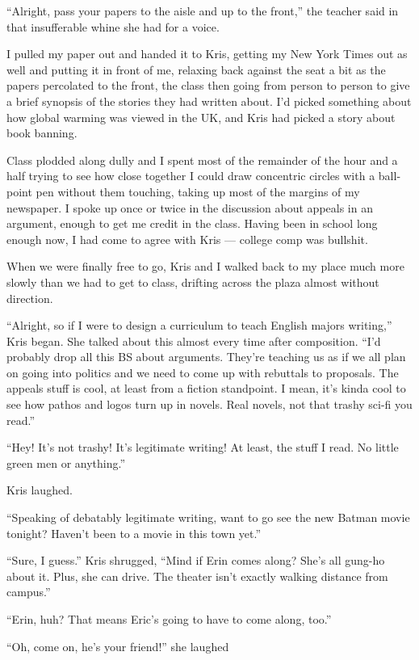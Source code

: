 ``Alright, pass your papers to the aisle and up to the front,'' the teacher said in that insufferable whine she had for a voice.

I pulled my paper out and handed it to Kris, getting my New York Times out as well and putting it in front of me, relaxing back against the seat a bit as the papers percolated to the front, the class then going from person to person to give a brief synopsis of the stories they had written about.  I'd picked something about how global warming was viewed in the UK, and Kris had picked a story about book banning.

Class plodded along dully and I spent most of the remainder of the hour and a half trying to see how close together I could draw concentric circles with a ball-point pen without them touching, taking up most of the margins of my newspaper.  I spoke up once or twice in the discussion about appeals in an argument, enough to get me credit in the class.  Having been in school long enough now, I had come to agree with Kris ---  college comp was bullshit.

When we were finally free to go, Kris and I walked back to my place much more slowly than we had to get to class, drifting across the plaza almost without direction.

``Alright, so if I were to design a curriculum to teach English majors writing,'' Kris began.  She talked about this almost every time after composition.  ``I'd probably drop all this BS about arguments.  They're teaching us as if we all plan on going into politics and we need to come up with rebuttals to proposals.  The appeals stuff is cool, at least from a fiction standpoint.  I mean, it's kinda cool to see how pathos and logos turn up in novels.  Real novels, not that trashy sci-fi you read.''

``Hey!  It's not trashy!  It's legitimate writing!  At least, the stuff I read.  No little green men or anything.''

Kris laughed.

``Speaking of debatably legitimate writing, want to go see the new Batman movie tonight?  Haven't been to a movie in this town yet.''

``Sure, I guess.''  Kris shrugged, ``Mind if Erin comes along?  She's all gung-ho about it.  Plus, she can drive.  The theater isn't exactly walking distance from campus.''

``Erin, huh?  That means Eric's going to have to come along, too.''

``Oh, come on, he's your friend!'' she laughed


